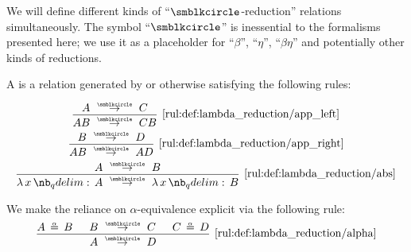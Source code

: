 \begin{definition}\label{def:lambda_reduction}
  We will define different kinds of \enquote{\( {\anon} \)-reduction} relations simultaneously. The symbol \enquote{\( {\anon} \)} is inessential to the formalisms presented here; we use it as a placeholder for \enquote{\( \beta \)}, \enquote{\( \eta \)}, \enquote{\( \beta\eta \)} and potentially other kinds of reductions.

  \begin{thmenum}
     A  is a relation generated by or otherwise satisfying the following rules:
    \begin{ThreeColumns}
      \begin{equation*}\taglabel[\ensuremath{ \logic{App}_{\anon}^L }]{rul:def:lambda_reduction/app_left}
        \begin{prooftree}
          \hypo{ A \pred C }
          \infer1[\ref{rul:def:lambda_reduction/app_left}]{ AB \pred CB }
        \end{prooftree}
      \end{equation*}
    \BeginSecondColumn
      \begin{equation*}\taglabel[\ensuremath{ \logic{App}_{\anon}^R }]{rul:def:lambda_reduction/app_right}
        \begin{prooftree}
          \hypo{ B \pred D }
          \infer1[\ref{rul:def:lambda_reduction/app_right}]{ AB \pred AD }
        \end{prooftree}
      \end{equation*}
    \BeginThirdColumn
      \begin{equation*}\taglabel[\ensuremath{ \logic{Abs}_{\anon} }]{rul:def:lambda_reduction/abs}
        \begin{prooftree}
          \hypo{ A \pred B }
          \infer1[\ref{rul:def:lambda_reduction/abs}]{ \qabs x A \pred \qabs x B }
        \end{prooftree}
      \end{equation*}
    \end{ThreeColumns}

    We make the reliance on \( \alpha \)-equivalence explicit via the following rule:
    \begin{equation*}\taglabel[\ensuremath{ \logic{Alpha}_{\anon} }]{rul:def:lambda_reduction/alpha}
      \begin{prooftree}
        \hypo{ A \aequiv B }
        \hypo{ B \pred C }
        \hypo{ C \aequiv D }
        \infer3[\ref{rul:def:lambda_reduction/alpha}]{ A \pred D }.
      \end{prooftree}
    \end{equation*}


\end{thmenum}
\end{definition}
